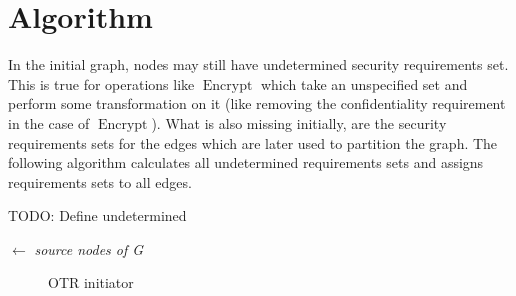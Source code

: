 \documentclass[a4paper]{article}
\DeclareMathOperator{\enc}{Encrypt}
\newcommand{\TODO}[1]{\small\noindent\color{red} TODO: #1\color{black}}
\begin{document}
\section{Algorithm}

In the initial graph, nodes may still have undetermined security requirements
set. This is true for operations like $\enc$ which take an unspecified set and
perform some transformation on it (like removing the confidentiality
requirement in the case of $\enc$). What is also missing initially, are the
security requirements sets for the edges which are later used to partition the
graph. The following algorithm calculates all undetermined requirements sets
and assigns requirements sets to all edges.

\TODO{Define undetermined}

\begin{algorithm}
    \Start $\leftarrow$ \emph{source nodes of G}\;
    \For{}
    {
    }
\end{algorithm}

\begin{landscape}
\thispagestyle{empty}
    \begin{figure}[ht]
        \centering
        \begin{dot2tex}[mathmode,scale=0.4]
            
        \end{dot2tex}
        \caption{OTR initiator}
    \end{figure}
\end{landscape}
\end{document}
